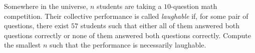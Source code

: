 Somewhere in the universe, $n$ students are taking a $10$-question math competition. Their collective performance is called \emph{laughable} if, for some pair of questions, there exist $57$ students such that either all of them answered both questions correctly or none of them answered both questions correctly. Compute the smallest $n$ such that the performance is necessarily laughable.